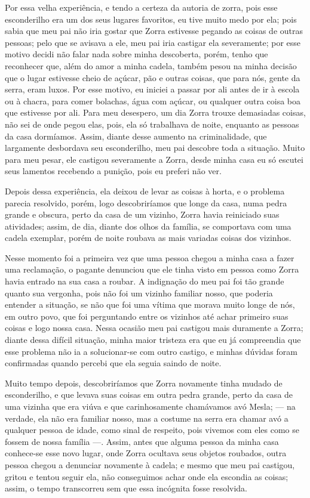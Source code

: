 Por essa velha experiência, e tendo a certeza da autoria de zorra, pois esse esconderilho era um dos seus lugares favoritos, eu tive muito medo por ela; pois sabia que meu pai não iria gostar que Zorra estivesse pegando as coisas de outras pessoas; pelo que se avisava a ele, meu pai iria castigar ela severamente; por esse motivo decidi não falar nada sobre minha descoberta, porém, tenho que reconhecer que, além do amor a minha cadela, também pesou na minha decisão que o lugar estivesse cheio de açúcar, pão e outras coisas, que para nós, gente da serra, eram luxos. 
Por esse motivo, eu iniciei a passar por ali antes de ir à escola ou à chacra, para comer bolachas, água com açúcar, ou qualquer outra coisa boa que estivesse por ali. 
Para meu desespero, um dia Zorra trouxe demasiadas coisas, não sei de onde pegou elas, pois, ela só trabalhava de noite, enquanto as pessoas da casa dormíamos. Assim, diante desse aumento na criminalidade, que largamente desbordava seu esconderilho, meu pai descobre toda a situação.
Muito para meu pesar, ele castigou severamente a Zorra, desde minha casa eu só escutei seus lamentos recebendo a punição, pois eu preferi não ver.

Depois dessa experiência, ela deixou de  levar as coisas à horta, e o problema parecia resolvido, porém, logo descobriríamos que longe da casa, numa pedra grande e obscura, perto da casa de um vizinho, Zorra havia reiniciado suas atividades; assim, de dia, diante dos olhos da família, se comportava com uma cadela exemplar, porém de noite roubava as mais variadas coisas dos vizinhos.

Nesse momento foi a primeira vez que uma pessoa chegou a minha casa a fazer uma reclamação, o pagante denunciou que ele tinha visto em pessoa como Zorra havia entrado na sua casa a roubar. 
A indignação do meu pai foi tão grande quanto sua vergonha, pois não foi um vizinho familiar nosso, que poderia entender a situação, se não que foi uma vítima que morava muito longe de nós, em outro povo, que foi perguntando entre os vizinhos até achar primeiro suas coisas e logo nossa casa.
Nessa ocasião meu pai castigou mais duramente a Zorra; diante dessa difícil situação, minha maior tristeza era que eu já compreendia que esse problema não ia a solucionar-se com outro castigo, e minhas dúvidas foram confirmadas quando percebi que ela seguia saindo de noite. 

Muito tempo depois, descobriríamos que Zorra novamente tinha mudado de esconderilho, e que levava suas coisas em outra pedra grande, perto da casa de uma vizinha que era viúva e que carinhosamente chamávamos avó Mesla; --- na verdade, ela não era familiar nosso, mas a costume na serra era chamar avó a qualquer pessoa de idade, como sinal de respeito, pois vivemos com eles como se fossem de nossa família ---.
Assim, antes que alguma pessoa da minha casa conhece-se esse novo lugar, onde Zorra ocultava seus objetos roubados, outra pessoa chegou a denunciar novamente à cadela; e mesmo que meu pai castigou, gritou e tentou seguir ela, não conseguimos achar onde ela escondia as coisas; assim, o tempo transcorreu sem que essa incógnita fosse resolvida. 

